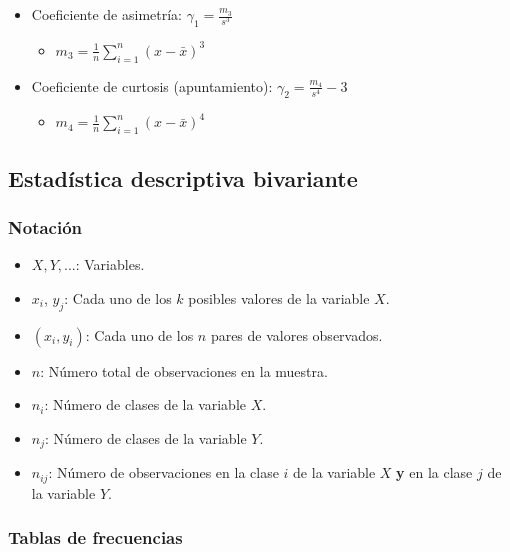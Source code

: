 \documentclass[
]{article}
\providecommand{\tightlist}{%
  \setlength{\itemsep}{0pt}\setlength{\parskip}{0pt}}
\begin{document}
\begin{itemize}
\tightlist
\item
  Coeficiente de asimetría: \(\gamma_1 = \frac{m_3}{s^3}\)

  \begin{itemize}
  \tightlist
  \item
    \(m_3 = \frac{1}{n}\sum\limits_{i=1}^n(x-\bar x ) ^3\)
  \end{itemize}
\item
  Coeficiente de curtosis (apuntamiento):
  \(\gamma_2 = \frac{m_4}{s^4}-3\)

  \begin{itemize}
  \tightlist
  \item
    \(m_4 = \frac{1}{n}\sum\limits_{i=1}^n(x-\bar x ) ^4\)
  \end{itemize}
\end{itemize}

\hypertarget{estaduxedstica-descriptiva-bivariante}{%
\subsection{Estadística descriptiva
bivariante}\label{estaduxedstica-descriptiva-bivariante}}

\hypertarget{notaciuxf3n-1}{%
\subsubsection{Notación}\label{notaciuxf3n-1}}

\begin{itemize}
\item
  \(X, Y, ...\): Variables.
\item
  \(x_i\), \(y_j\): Cada uno de los \(k\) posibles valores de la
  variable \(X\).
\item
  \((x_i, y_i)\): Cada uno de los \(n\) pares de valores observados.
\item
  \(n\): Número total de observaciones en la muestra.
\item
  \(n_i\): Número de clases de la variable \(X\).
\item
  \(n_j\): Número de clases de la variable \(Y\).
\item
  \(n_{ij}\): Número de observaciones en la clase \(i\) de la variable
  \(X\) \textbf{y} en la clase \(j\) de la variable \(Y\).
\end{itemize}

\hypertarget{tablas-de-frecuencias-1}{%
\subsubsection{Tablas de frecuencias}\label{tablas-de-frecuencias-1}}
\end{document}
